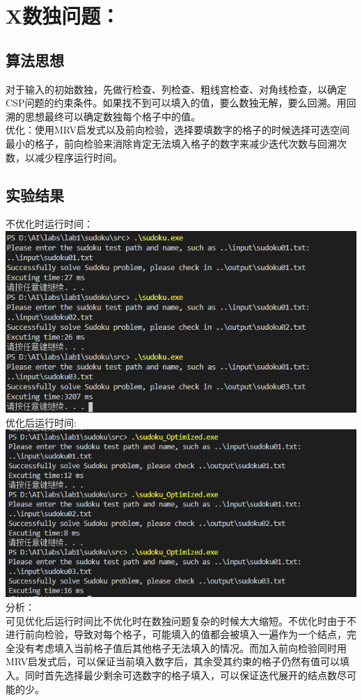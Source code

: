 \documentclass{article}
\begin{document}
	\section*{X数独问题：}
	\subsection*{算法思想}
	对于输入的初始数独，先做行检查、列检查、粗线宫检查、对角线检查，以确定CSP问题的约束条件。如果找不到可以填入的值，要么数独无解，要么回溯。用回溯的思想最终可以确定数独每个格子中的值。\\
	优化：使用MRV启发式以及前向检验，选择要填数字的格子的时候选择可选空间最小的格子，前向检验来消除肯定无法填入格子的数字来减少迭代次数与回溯次数，以减少程序运行时间。
	\subsection*{实验结果}
	不优化时运行时间：\\
	\includegraphics*[scale = 0.6]{4.png}\\
	优化后运行时间: \\
	\includegraphics*[scale = 0.6]{5.png}\\
	分析：\\
	可见优化后运行时间比不优化时在数独问题复杂的时候大大缩短。不优化时由于不进行前向检验，导致对每个格子，可能填入的值都会被填入一遍作为一个结点，完全没有考虑填入当前格子值后其他格子无法填入的情况。而加入前向检验同时用MRV启发式后，可以保证当前填入数字后，其余受其约束的格子仍然有值可以填入。同时首先选择最少剩余可选数字的格子填入，可以保证迭代展开的结点数尽可能的少。
\end{document}
